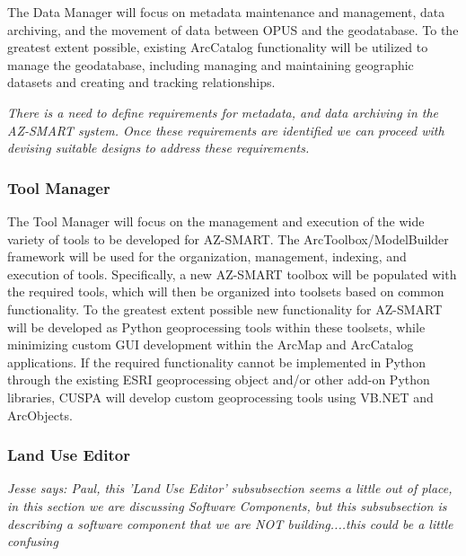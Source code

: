 The Data Manager will focus on metadata maintenance and management, data archiving, and the movement of data between OPUS and the geodatabase.  To the greatest extent possible, existing ArcCatalog functionality will be utilized to manage the geodatabase, including managing and maintaining geographic datasets and creating and tracking relationships.

\emph{There is a need to define requirements for metadata, and data archiving in the AZ-SMART system.  Once these requirements are identified we can proceed with devising suitable designs to address these requirements.}

\subsubsection{Tool Manager}

The Tool Manager will focus on the management and execution of the wide variety of tools to be developed for AZ-SMART.  The ArcToolbox/ModelBuilder framework will be used for the organization, management, indexing, and execution of tools.  Specifically, a new AZ-SMART toolbox will be populated with the required tools, which will then be organized into toolsets based on common functionality.  To the greatest extent possible new functionality for AZ-SMART will be developed as Python geoprocessing tools within these toolsets, while minimizing custom GUI development within the ArcMap and ArcCatalog applications.  If the required functionality cannot be implemented in Python through the existing ESRI geoprocessing object and/or other add-on Python libraries, CUSPA will develop custom geoprocessing tools using VB.NET and ArcObjects.


\subsubsection{Land Use Editor}
\emph{Jesse says: Paul, this 'Land Use Editor' subsubsection seems a little out of place, in this section we are discussing Software Components, but this subsubsection is describing a software component that we are NOT building....this could be a little confusing}

